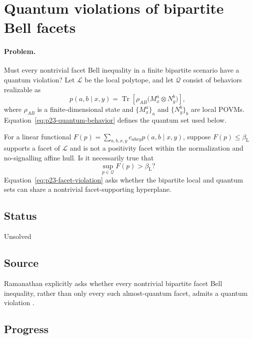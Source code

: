 \section{Quantum violations of bipartite Bell facets}
\label{sec:problem-23}

\paragraph{Problem.}
Must every nontrivial facet Bell inequality in a finite bipartite scenario
have a quantum violation?  Let $\mathcal L$ be the local polytope, and let
$\mathcal Q$ consist of behaviors realizable as
\begin{equation}
  p(a,b\mid x,y)
  =\operatorname{Tr}\!\left[\rho_{AB}
    \bigl(M_x^a\otimes N_y^b\bigr)\right],
  \label{eq:p23-quantum-behavior}
\end{equation}
where $\rho_{AB}$ is a finite-dimensional state and $\{M_x^a\}_a$ and
$\{N_y^b\}_b$ are local POVMs.  Equation~\eqref{eq:p23-quantum-behavior}
defines the quantum set used below.

For a linear functional $F(p)=\sum_{a,b,x,y}c_{abxy}p(a,b\mid x,y)$, suppose
$F(p)\leq\beta_{\mathrm L}$ supports a facet of $\mathcal L$ and is not a
positivity facet within the normalization and no-signalling affine hull.  Is
it necessarily true that
\begin{equation}
  \sup_{p\in\mathcal Q}F(p)>\beta_{\mathrm L}?
  \label{eq:p23-facet-violation}
\end{equation}
Equation~\eqref{eq:p23-facet-violation} asks whether the bipartite local and
quantum sets can share a nontrivial facet-supporting hyperplane.

\subsection*{Status}

Unsolved

\subsection*{Source}

Ramanathan explicitly asks whether every nontrivial bipartite facet Bell
inequality, rather than only every such almost-quantum facet, admits a quantum
violation .

\subsection*{Progress}

